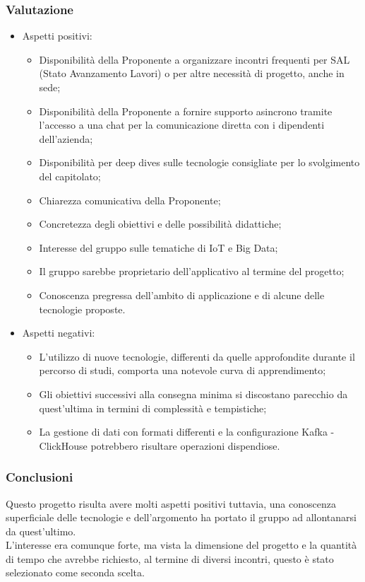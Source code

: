 \subsubsection{Valutazione}
\begin{itemize}
  \item Aspetti positivi:
  \begin{itemize}
    \item Disponibilità della Proponente a organizzare incontri frequenti per SAL (Stato Avanzamento Lavori) o per altre necessità di progetto, anche in sede;
    \item Disponibilità della Proponente a fornire supporto asincrono tramite l’accesso a una chat per la comunicazione diretta con i dipendenti dell'azienda;
    \item Disponibilità per deep dives sulle tecnologie consigliate per lo svolgimento del 	capitolato;
    \item Chiarezza comunicativa della Proponente;
    \item Concretezza degli obiettivi e delle possibilità didattiche;
    \item Interesse del gruppo sulle tematiche di IoT e Big Data;
    \item Il gruppo sarebbe proprietario dell'applicativo al termine del progetto;
    \item Conoscenza pregressa dell'ambito di applicazione e di alcune delle tecnologie proposte.
  \end{itemize}
  \item Aspetti negativi:
  \begin{itemize}
    \item L'utilizzo di nuove tecnologie, differenti da quelle approfondite durante il percorso di studi, comporta una notevole curva di apprendimento;
    \item Gli obiettivi successivi alla consegna minima si discostano parecchio da quest'ultima in termini di complessità e tempistiche;
    \item La gestione di dati con formati differenti e la configurazione Kafka - ClickHouse potrebbero risultare operazioni dispendiose.
  \end{itemize}
\end{itemize}

\subsubsection{Conclusioni}
Questo progetto risulta avere molti aspetti positivi tuttavia, una conoscenza superficiale delle tecnologie e dell’argomento ha portato il gruppo ad allontanarsi da quest’ultimo.\\
L’interesse era comunque forte, ma vista la dimensione del progetto e la quantità di tempo che avrebbe richiesto, al termine di diversi incontri, questo è stato selezionato come seconda scelta.

